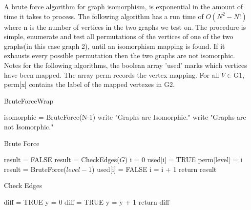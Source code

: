 \documentclass[notitlepage]{report}
\begin{document}
A brute force algorithm for graph isomorphism, is exponential in the amount of time it takes to process. The following algorithm has a run time of $O(N^{2}-N!)$ where n is the number of vertices in the two graphs we test on. The procedure is simple, enumerate and test all permutations of the vertices of one of the two graphs(in this case graph 2), until an isomorphism mapping is found. If it exhausts every possible permutation then the two graphs are not isomorphic. Notes for the following algorithms, the boolean array 'used' marks which vertices have been mapped. The array perm records the vertex mapping. For all $V\in$G1, perm[x] contains the label of the mapped vertexes in G2.~\cite{tolley}

\begin{algorithm}
\caption{BruteForceWrap}
\begin{algorithmic}[1]

    \State isomorphic = BruteForce(N-1) 
        \State write "Graphs are Isomorphic."
    \Else
    	\State write "Graphs are not Isomorphic."
    \EndIf
    \label{A1}
\EndProcedure
\end{algorithmic}
\end{algorithm}

\begin{algorithm}
\caption{Brute Force}
\begin{algorithmic}[1]

    \State result = FALSE 								
    	\State result = CheckEdges($G$)
    \Else
    	\State i = 0
	    				
	        	\State used[i] = TRUE 					
	        	\State perm[level] = i
	        	\State result = BruteForce($level - 1$)
	        	\State used[i] = FALSE					
	        \EndIf
	        \State i = i + 1	
	    \EndWhile
	\EndIf
	\State return result
\label{BruteForce}
\EndProcedure

\end{algorithmic}
\end{algorithm}

\begin{algorithm}
\caption{Check Edges}
\begin{algorithmic}[1]

    \State diff = TRUE
        \State y = 0
        	\State diff = TRUE
        \EndIf
        \State y = y + 1
        \EndWhile
    \EndFor
    \State return diff
\label{CheckEdge}
\EndProcedure

\end{algorithmic}
\end{algorithm}
\newpage
\end{document}
